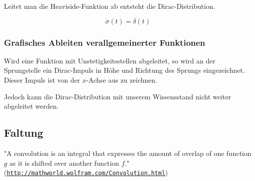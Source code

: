\documentclass[12pt, a4paper]{scrartcl}
\begin{document}
Leitet man die Heaviside-Funktion ab entsteht die Dirac-Distribution.

\begin{framed}
  \[
    \dot{\sigma} (t) = \delta (t)
  \]
\end{framed}

\subsubsection{Grafisches Ableiten verallgemeinerter Funktionen}

\begin{minipage}{.45\textwidth}
  Wird eine Funktion mit Unstetigkeitsstellen abgeleitet, so wird an der Sprungstelle ein Dirac-Impuls in Höhe und Richtung des Sprungs eingezeichnet. Dieser Impuls ist von der \(x\)-Achse aus zu zeichnen.
\end{minipage}\hfill%
\begin{minipage}{.45\textwidth}
\end{minipage}

Jedoch kann die Dirac-Distribution mit unserem Wissensstand nicht weiter abgeleitet werden.

\subsection{Faltung}

"A convolution is an integral that expresses the amount of overlap of one function \(g\) as it is shifted over another function \(f\)." (\href{http://mathworld.wolfram.com/Convolution.html}{\texttt{http://mathworld.wolfram.com/Convolution.html}})
\end{document}
